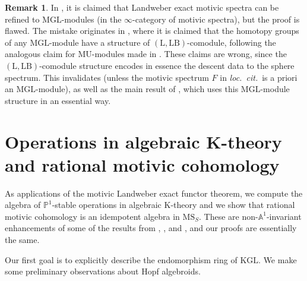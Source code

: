 \documentclass{amsart}
\numberwithin{equation}{section}
\theoremstyle{plain}
\theoremstyle{definition}
\newtheorem{remark}[equation]{Remark}
\let\bb=\mathbb
\def\A{\bb A}
\def\P{\bb P}
\def\L{\mathrm{L}{}}
\def\LB{\mathrm{LB}{}}
\def\MU{\mathrm{MU}}
\def\MGL{\mathrm{MGL}}
\def\KGL{\mathrm{KGL}}
\def\MS{\mathrm{MS}}
\begin{document}
\begin{remark}
	In \cite[Proposition 8.9]{Naumann:2009}, it is claimed that Landweber exact motivic spectra can be refined to $\MGL$-modules (in the $\infty$-category of motivic spectra), but the proof is flawed.
	The mistake originates in \cite[Proposition 7.9]{Naumann:2009}, where it is claimed that the homotopy groups of any $\MGL$-module have a structure of $(\L,\LB)$-comodule, following the analogous claim for $\MU$-modules made in \cite[Lemma 11]{MayWrong}. These claims are wrong, since the $(\L,\LB)$-comodule structure encodes in essence the descent data to the sphere spectrum.
	This invalidates \cite[Theorem 9.7]{Naumann:2009} (unless the motivic spectrum $F$ in \emph{loc.\ cit.}\ is a priori an $\MGL$-module), as well as the main result of \cite{Spitzweck:2012}, which uses this $\MGL$-module structure in an essential way.
\end{remark}

\section{Operations in algebraic K-theory and rational motivic cohomology}
\label{sec:HQ}

As applications of the motivic Landweber exact functor theorem, we compute the algebra of $\P^1$-stable operations in algebraic K-theory and we show that rational motivic cohomology is an idempotent algebra in $\MS_S$. These are non-$\A^1$-invariant enhancements of some of the results from \cite[Section~5.3]{RiouK}, \cite[Sections 9 and~10]{Naumann:2009}, and \cite[Section~14.1]{CD}, and our proofs are essentially the same.

Our first goal is to explicitly describe the endomorphism ring of $\KGL$.
We make some preliminary observations about Hopf algebroids. 
\end{document}
